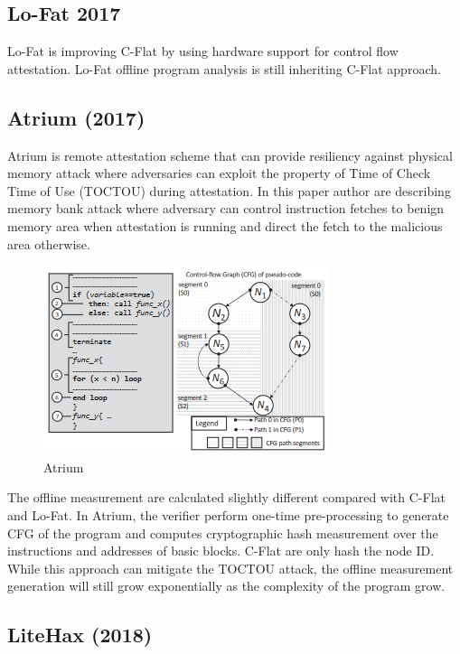 \subsection{Lo-Fat 2017}

Lo-Fat\cite{dessoukyLOFATLowOverheadControl2017} is improving C-Flat by using hardware support for control flow attestation. Lo-Fat offline program analysis is still inheriting C-Flat approach.

\subsection{Atrium (2017)}

Atrium \cite{zeitouniATRIUMRuntimeAttestation2017} is remote attestation scheme that can provide resiliency against physical memory attack where adversaries can exploit the property of Time of Check Time of Use (TOCTOU) during attestation. In this paper author are describing memory bank attack where adversary can control instruction fetches to benign memory area when attestation is running and direct the fetch to the malicious area otherwise.

\begin{figure}[htbp]
\centerline{\includegraphics[scale=.5]{Figures/atrium.png}}
\caption{Atrium}
\label{fig:4-2}
\end{figure}

The offline measurement are calculated slightly different compared with C-Flat and Lo-Fat. In Atrium, the verifier perform one-time pre-processing to generate CFG of the program and computes cryptographic hash measurement over the instructions and addresses of basic blocks. C-Flat are only hash the node ID. While this approach can mitigate the TOCTOU attack, the offline measurement generation will still grow exponentially as the complexity of the program grow. 

\subsection{LiteHax (2018)}

